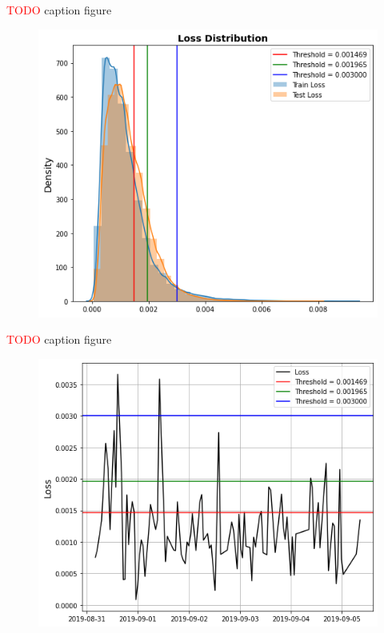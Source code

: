 \textcolor{red}{TODO} caption figure

\begin{figure}[H]
\centering
  \includegraphics[scale=0.4]{img/task_2/train_test_loss.png}
  \caption{}
  \label{fig: }
\end{figure}

\textcolor{red}{TODO} caption figure

\begin{figure}[H]
\centering
  \includegraphics[scale=0.4]{img/task_2/anomalies.png}
  \caption{}
  \label{fig: }
\end{figure}

